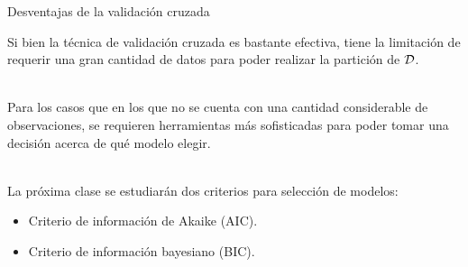 \documentclass[9pt]{beamer}
\begin{document}
\begin{frame}{Desventajas de la validación cruzada}

Si bien la técnica de validación cruzada es bastante efectiva, tiene la limitación de requerir una gran cantidad de datos para poder realizar la partición de ${\mathcal D}$.\\~\ 

Para los casos que en los que no se cuenta con una cantidad considerable de observaciones, se requieren herramientas más sofisticadas para poder tomar una decisión acerca de qué modelo elegir.\\~\ \pause

La próxima clase se estudiarán dos criterios para selección de modelos:

\begin{itemize}
	\item Criterio de información de Akaike (AIC).
	\item Criterio de información bayesiano (BIC).
\end{itemize}

	
\end{frame}
\end{document}
